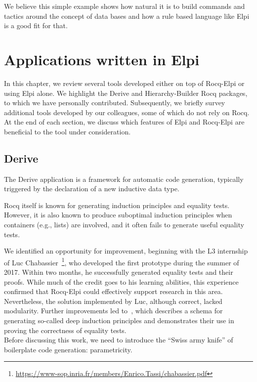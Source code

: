 \documentclass{these-ISSS}
\begin{document}
We believe this simple example shows how natural it is to build
commands and tactics around the concept of data bases and how a
rule based language like Elpi is a good fit for that.


\chapter{Applications written in Elpi}

In this chapter, we review several tools developed either on top of Rocq-Elpi
or using Elpi alone.
We highlight the Derive and Hierarchy-Builder Rocq packages, to which we have
personally contributed.
Subsequently, we briefly survey additional tools developed by our colleagues,
some of which do not rely on Rocq.
At the end of each section, we discuss which features of Elpi and Rocq-Elpi are
beneficial to the tool under consideration.

\section{Derive}\label{sec:derive}

The Derive application is a framework for automatic code generation, 
typically triggered by the declaration of a new inductive data type.

Rocq itself is known for generating induction principles and equality tests.
However, it is also known to produce suboptimal induction principles when
containers (e.g., lists) are involved, and it often fails to generate useful
equality tests.

We identified an opportunity for improvement, beginning with the L3
internship of Luc Chabassier~\footnote{\url{https://www-sop.inria.fr/members/Enrico.Tassi/chabassier.pdf}}, who developed the first prototype during the
summer of 2017. Within two months, he successfully generated equality tests
and their proofs. While much of the credit goes to his learning abilities,
this experience confirmed that Rocq-Elpi could effectively support research
in this area. Nevertheless, the solution implemented by Luc, although correct,
lacked modularity. Further improvements led to~\cite{tassi:hal-01897468},
which describes a schema for generating so-called deep induction principles
and demonstrates their use in proving the correctness of equality tests.
~\\

Before discussing this work, we need to introduce the ``Swiss army knife''
of boilerplate code generation: parametricity.
\end{document}
